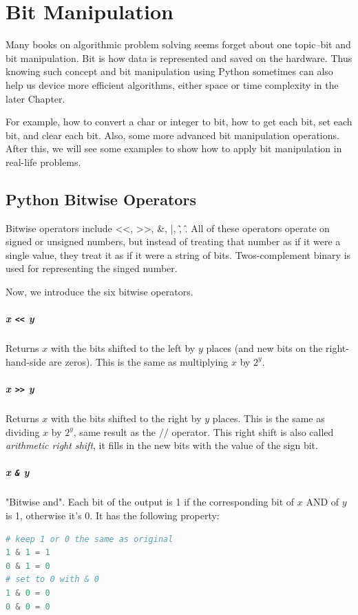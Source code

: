 \documentclass[../main.tex]{subfiles}
\begin{document}
\chapter{Bit Manipulation}
Many books on algorithmic problem solving seems forget about one topic--bit and bit manipulation. Bit is how data is represented and saved on the hardware. Thus knowing such concept and bit manipulation using Python sometimes can also help us device more efficient algorithms, either space or time complexity in the later Chapter. 


For example, how to convert a char or integer to bit, how to get each bit, set each bit, and clear each bit. Also, some more advanced bit manipulation operations. After this, we will see some examples to show how to apply bit manipulation in real-life problems. 
\section{Python Bitwise Operators}
\label{sec_basic_bit_operator}
Bitwise operators include <<, >>, \&, |, \~, \^. All of these operators operate on signed or unsigned numbers, but instead of treating that number as if it were a single value, they treat it as if it were a string of bits. Twos-complement binary is used for representing the singed number.  




Now, we introduce the six bitwise operators.
\paragraph{x \texttt{<<} y} Returns $x$ with the bits shifted to the left by $y$ places (and new bits on the right-hand-side are zeros). This is the same as multiplying $x$ by $2^y$.

\paragraph{x \texttt{>>} y} Returns $x$ with the bits shifted to the right by $y$ places. This is the same as dividing $x$ by $2^y$, same result as the $//$ operator. This right shift is also called \textit{arithmetic right shift}, it fills in the new bits with the value of the sign bit. 

\paragraph{x \texttt{\&} y} "Bitwise and". Each bit of the output is 1 if the corresponding bit of $x$ AND of $y$ is 1, otherwise it's 0. It has the following property: 
\begin{lstlisting}[language=Python]
# keep 1 or 0 the same as original
1 & 1 = 1
0 & 1 = 0
# set to 0 with & 0
1 & 0 = 0
0 & 0 = 0
\end{lstlisting}
\end{document}
